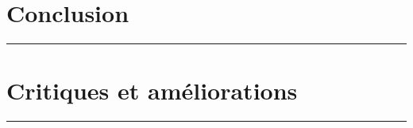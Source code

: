 \documentclass[10pt,letterpaper]{article}
\begin{document}
\newpage
\section{Conclusion}
\hrule
\vspace{1em}
\lipsum[4]



\vspace{2em}
\section{Critiques et améliorations}
\hrule
\vspace{1em}
\lipsum[5]
\end{document}
